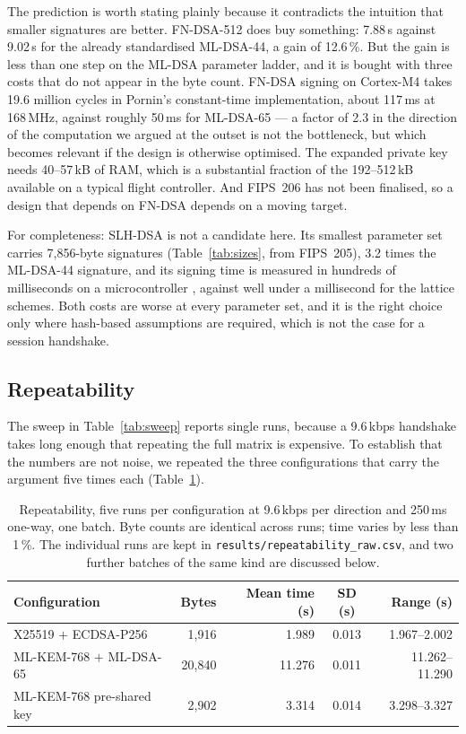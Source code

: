 \documentclass[drones,article,submit,pdftex,moreauthors]{Definitions/mdpi}
\newcommand{\kbps}{kbps}
\newcommand{\mlkem}{ML-KEM}
\newcommand{\mldsa}{ML-DSA}
\newcommand{\slhdsa}{SLH-DSA}
\newcommand{\fndsa}{FN-DSA}
\begin{document}
The prediction is worth stating plainly because it contradicts the
intuition that smaller signatures are better. \fndsa{}-512 does buy
something: 7.88\,s against 9.02\,s for the already standardised
\mldsa{}-44, a gain of 12.6\,\%. But the gain is less than one step on
the \mldsa{} parameter ladder, and it is bought with three costs that do
not appear in the byte count. \fndsa{} signing on Cortex-M4 takes
19.6 million cycles in Pornin's constant-time implementation, about
117\,ms at 168\,MHz, against roughly 50\,ms for \mldsa{}-65
\cite{pornin2019falcon} --- a factor of 2.3 in the direction of the
computation we argued at the outset is not the bottleneck, but which
becomes relevant if the design is otherwise optimised. The expanded
private key needs 40--57\,kB of RAM, which is a substantial fraction of
the 192--512\,kB available on a typical flight controller. And
FIPS~206 has not been finalised, so a design that depends on \fndsa{}
depends on a moving target.

For completeness: \slhdsa{} is not a candidate here. Its smallest
parameter set carries 7{,}856-byte signatures (Table~\ref{tab:sizes},
from FIPS~205), 3.2 times the \mldsa{}-44 signature, and its signing
time is measured in hundreds of milliseconds on a microcontroller
\cite{pqm4}, against well under a millisecond for the lattice schemes.
Both costs are worse at every parameter set, and it is the right choice
only where hash-based assumptions are required, which is not the case
for a session handshake.

\subsection{Repeatability}
\label{sec:repeat}

The sweep in Table~\ref{tab:sweep} reports single runs, because a
9.6\,\kbps{} handshake takes long enough that repeating the full matrix
is expensive. To establish that the numbers are not noise, we repeated
the three configurations that carry the argument five times each
(Table~\ref{tab:repeat}).

\begin{table}[H]
\caption{Repeatability, five runs per configuration at 9.6\,\kbps{}
per direction and 250\,ms one-way, one batch. Byte counts are identical
across runs; time varies by less than 1\,\%. The individual runs are
kept in \texttt{results/repeatability\_raw.csv}, and two further batches
of the same kind are discussed below.}
\label{tab:repeat}
\centering
\begin{tabular}{lrrcr}
\toprule
Configuration & Bytes & Mean time (s) & SD (s) & Range (s) \\
\midrule
X25519 $+$ ECDSA-P256        & 1{,}916  & 1.989 & 0.013 & 1.967--2.002 \\
\mlkem{}-768 $+$ \mldsa{}-65 & 20{,}840 & 11.276 & 0.011 & 11.262--11.290 \\
\mlkem{}-768 pre-shared key  & 2{,}902  & 3.314 & 0.014 & 3.298--3.327 \\
\bottomrule
\end{tabular}
\end{table}
\end{document}
